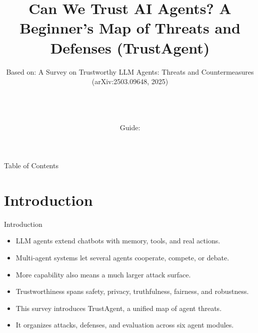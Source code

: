 \documentclass[10pt]{beamer}
\title[B.Tech Seminar]{Can We Trust AI Agents? A Beginner's Map of Threats and Defenses (TrustAgent)}
\subtitle{Based on: A Survey on Trustworthy LLM Agents: Threats and Countermeasures (arXiv:2503.09648, 2025)}
\author[\studentname\ (\shortinst)]{\studentname \\ \small \rollno \\ \small \rollclass \\ \small Guide: \guidename}
\institute[]{\deptname \\ \collegename}
\date{\seminardate}
\begin{document}
\begin{frame}[plain]
  \titlepage
\end{frame}
\begin{frame}{Table of Contents}
  \tableofcontents
\end{frame}
\section{Introduction}
\begin{frame}{Introduction}
\begin{itemize}
  \item LLM agents extend chatbots with memory, tools, and real actions.
  \item Multi-agent systems let several agents cooperate, compete, or debate.
  \item More capability also means a much larger attack surface.
  \item Trustworthiness spans safety, privacy, truthfulness, fairness, and robustness.
  \item This survey introduces TrustAgent, a unified map of agent threats.
  \item It organizes attacks, defenses, and evaluation across six agent modules.
\end{itemize}
\end{frame}
\end{document}
